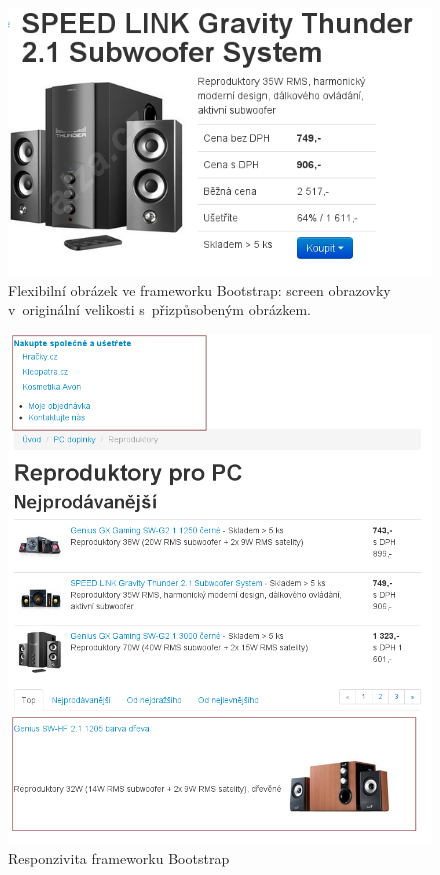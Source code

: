 \documentclass[thesis=B,czech]{FITthesis}[2012/06/26]
\begin{document}
\begin{figure}[h]
	\begin{center}
	\includegraphics[scale=1]{images/image15.png}
	\end{center}
	\caption[Flexibilní obrázek ve frameworku Bootstrap]{Flexibilní obrázek ve frameworku Bootstrap: screen obrazovky v~originální velikosti s~přizpůsobeným obrázkem.}
	\label{imgB2}
\end{figure}

\begin{figure}[p]
	\begin{center}
	\includegraphics[scale=0.7]{images/image11.png}
	\end{center}
	\caption{Responzivita frameworku Bootstrap}
	\label{imgB3}
\end{figure}
\end{document}
